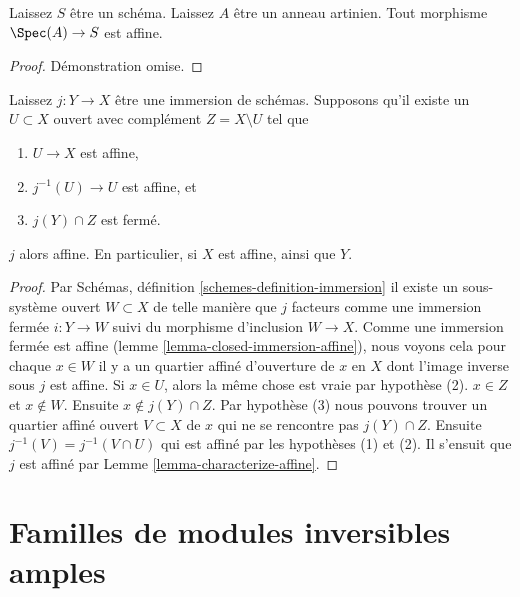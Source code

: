 \begin{lemma}

\label{lemma-Artinian-affine}
Laissez $S$ être un schéma. Laissez $A$ être un anneau artinien. Tout morphisme $\Spec(A) \to S$ est affine.
\end{lemma}

\begin{proof}
Démonstration omise.
\end{proof}

\begin{lemma}

\label{lemma-get-affine}
Laissez $j : Y \to X$ être une immersion de schémas. Supposons qu'il existe un $U \subset X$ ouvert avec complément $Z = X \setminus U$ tel que
\begin{enumerate}
\item $U \to X$ est affine,
\item $j^{-1}(U) \to U$ est affine, et
\item $j(Y) \cap Z$ est fermé.
\end{enumerate}
$j$ alors affine. En particulier, si $X$ est affine, ainsi que $Y$.
\end{lemma}

\begin{proof}

Par Schémas, définition \ref{schemes-definition-immersion} il existe un sous-système ouvert $W \subset X$ de telle manière que $j$ facteurs comme une immersion fermée
$i : Y \to W$ suivi du morphisme d'inclusion $W \to X$. Comme une immersion fermée est affine (lemme \ref{lemma-closed-immersion-affine}), nous voyons cela pour chaque $x \in W$ il y a un quartier affiné d'ouverture de $x$ en $X$ dont l'image inverse sous $j$ est affine. Si $x \in U$, alors la même chose est vraie par hypothèse (2). $x \in Z$ et $x \not \in W$. Ensuite $x \not \in j(Y) \cap Z$. Par hypothèse (3) nous pouvons trouver un quartier affiné ouvert
$V \subset X$ de $x$ qui ne se rencontre pas $j(Y) \cap Z$. Ensuite $j^{-1}(V) = j^{-1}(V \cap U)$ qui est affiné par les hypothèses (1) et (2). Il s'ensuit que $j$ est affiné par Lemme \ref{lemma-characterize-affine}.

\end{proof}







\section{Familles de modules inversibles amples}
\label{section-families-ample-invertible-modules}

